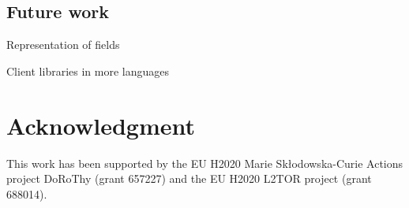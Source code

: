 \documentclass[letterpaper, 10 pt, conference]{ieeeconf}  %
\begin{document}
\subsection{Future work}
\label{futurework}

Representation of fields

Client libraries in more languages

\section*{Acknowledgment}

This work has been supported by the EU H2020 Marie Sk\l odowska-Curie Actions
project DoRoThy (grant 657227) and the EU H2020 L2TOR project (grant 688014).




\end{document}
